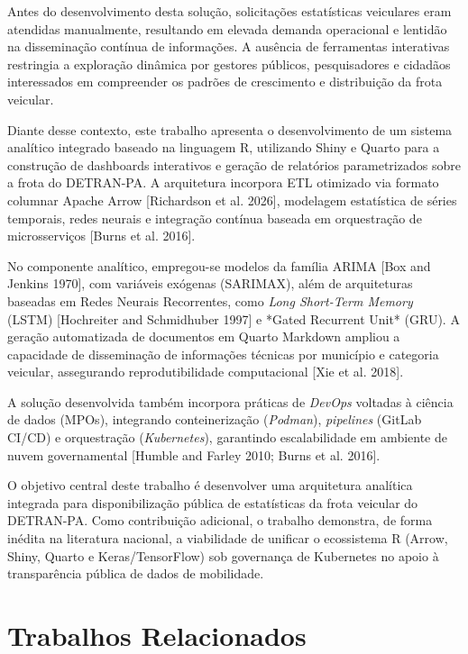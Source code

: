 \documentclass[12pt]{article}
\begin{document}
Antes do desenvolvimento desta solução, solicitações estatísticas veiculares eram atendidas manualmente, resultando em elevada demanda operacional e lentidão na disseminação contínua de informações. A ausência de ferramentas interativas restringia a exploração dinâmica por gestores públicos, pesquisadores e cidadãos interessados em compreender os padrões de crescimento e distribuição da frota veicular.

Diante desse contexto, este trabalho apresenta o desenvolvimento de um sistema analítico integrado baseado na linguagem R, utilizando Shiny e Quarto para a construção de dashboards interativos e geração de relatórios parametrizados sobre a frota do DETRAN-PA. A arquitetura incorpora ETL otimizado via formato columnar Apache Arrow [Richardson et al. 2026], modelagem estatística de séries temporais, redes neurais e integração contínua baseada em orquestração de microsserviços [Burns et al. 2016].

No componente analítico, empregou-se modelos da família ARIMA [Box and Jenkins 1970], com variáveis exógenas (SARIMAX), além de arquiteturas baseadas em Redes Neurais Recorrentes, como \textit{Long Short-Term Memory} (LSTM) [Hochreiter and Schmidhuber 1997] e *Gated Recurrent Unit* (GRU). A geração automatizada de documentos em Quarto Markdown ampliou a capacidade de disseminação de informações técnicas por município e categoria veicular, assegurando reprodutibilidade computacional [Xie et al. 2018].

A solução desenvolvida também incorpora práticas de \textit{DevOps} voltadas à ciência de dados (MPOs), integrando conteinerização (\textit{Podman}), \textit{pipelines} (GitLab CI/CD) e orquestração (\textit{Kubernetes}), garantindo escalabilidade em ambiente de nuvem governamental [Humble and Farley 2010; Burns et al. 2016].

O objetivo central deste trabalho é desenvolver uma arquitetura analítica integrada para disponibilização pública de estatísticas da frota veicular do DETRAN-PA. Como contribuição adicional, o trabalho demonstra, de forma inédita na literatura nacional, a viabilidade de unificar o ecossistema R (Arrow, Shiny, Quarto e Keras/TensorFlow) sob governança de Kubernetes no apoio à transparência pública de dados de mobilidade.

\section{Trabalhos Relacionados}
\end{document}
